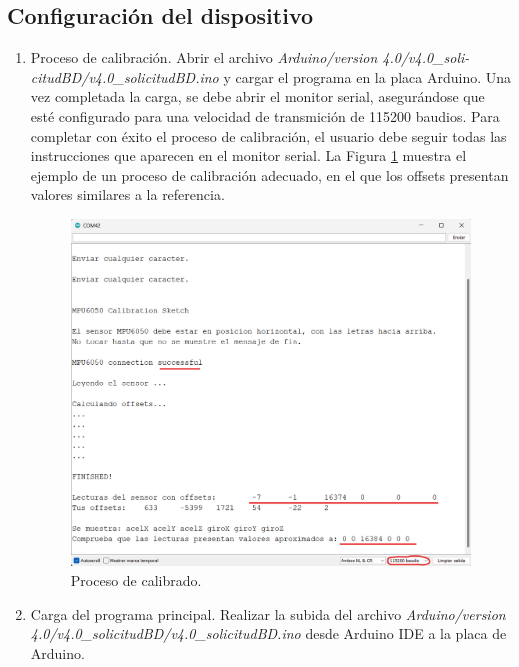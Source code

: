 \subsection{Configuración del dispositivo}
\begin{enumerate}
    \item Proceso de calibración. Abrir el archivo \textit{Arduino/version 4.0/v4.0\_soli-\\citudBD/v4.0\_solicitudBD.ino} y cargar el programa en la placa Arduino. Una vez completada la carga, se debe abrir el monitor serial, asegurándose que esté configurado para una velocidad de transmición de 115200 baudios. Para completar con éxito el proceso de calibración, el usuario debe seguir todas las instrucciones que aparecen en el monitor serial. La Figura \ref{fig:calibrado} muestra el ejemplo de un proceso de calibración adecuado, en el que los offsets presentan valores similares a la referencia.
    \begin{figure}[h]
        \centering
        \includegraphics[width=1\textwidth]{img/B2_InstalacionPuestaMarcha/calibrado_subrayado.png}
        \caption{Proceso de calibrado.}
        \label{fig:calibrado}
    \end{figure}
    
    \item Carga del programa principal. Realizar la subida del archivo \textit{Arduino/version 4.0/v4.0\_solicitudBD/v4.0\_solicitudBD.ino} desde Arduino IDE a la placa de Arduino.
\end{enumerate}

